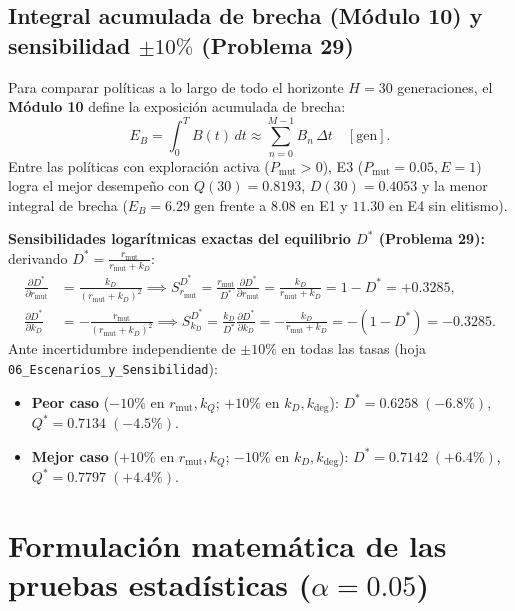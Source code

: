\documentclass[11pt,a4paper]{article}
\begin{document}
\subsection{Integral acumulada de brecha (M\'odulo 10) y sensibilidad $\pm 10\%$ (Problema 29)}

Para comparar pol\'iticas a lo largo de todo el horizonte $H=30$ generaciones, el \textbf{M\'odulo 10} define la exposici\'on acumulada de brecha:
\begin{equation}
E_B = \int_{0}^{T} B(t)\,dt \approx \sum_{n=0}^{M-1} B_n\,\Delta t \quad [\text{gen}].
\end{equation}
Entre las pol\'iticas con exploraci\'on activa ($P_{\text{mut}} > 0$), E3 ($P_{\text{mut}}=0.05, E=1$) logra el mejor desempe\~no con $Q(30) = 0.8193$, $D(30) = 0.4053$ y la menor integral de brecha ($E_B = 6.29\;\text{gen}$ frente a $8.08$ en E1 y $11.30$ en E4 sin elitismo).

\textbf{Sensibilidades logar\'itmicas exactas del equilibrio $D^*$ (Problema 29):} derivando $D^* = \frac{r_{\text{mut}}}{r_{\text{mut}} + k_D}$:
\begin{align}
\frac{\partial D^*}{\partial r_{\text{mut}}} &= \frac{k_D}{(r_{\text{mut}} + k_D)^2} \implies
S_{r_{\text{mut}}}^{D^*} = \frac{r_{\text{mut}}}{D^*}\frac{\partial D^*}{\partial r_{\text{mut}}} = \frac{k_D}{r_{\text{mut}} + k_D} = 1 - D^* = +0.3285, \\
\frac{\partial D^*}{\partial k_D} &= -\frac{r_{\text{mut}}}{(r_{\text{mut}} + k_D)^2} \implies
S_{k_D}^{D^*} = \frac{k_D}{D^*}\frac{\partial D^*}{\partial k_D} = -\frac{k_D}{r_{\text{mut}} + k_D} = -(1 - D^*) = -0.3285.
\end{align}
Ante incertidumbre independiente de $\pm 10\%$ en todas las tasas (hoja \texttt{06\_Escenarios\_y\_Sensibilidad}):
\begin{itemize}[leftmargin=1.5em]
    \item \textbf{Peor caso} ($-10\%$ en $r_{\text{mut}}, k_Q$; $+10\%$ en $k_D, k_{\text{deg}}$): $D^* = 0.6258\;(-6.8\%)$, $Q^* = 0.7134\;(-4.5\%)$.
    \item \textbf{Mejor caso} ($+10\%$ en $r_{\text{mut}}, k_Q$; $-10\%$ en $k_D, k_{\text{deg}}$): $D^* = 0.7142\;(+6.4\%)$, $Q^* = 0.7797\;(+4.4\%)$.
\end{itemize}

\section{Formulación matemática de las pruebas estadísticas ($\alpha = 0.05$)}
\end{document}
